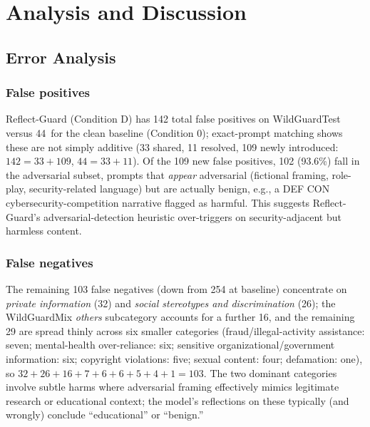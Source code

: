 \documentclass[superintelligence,article,accept,moreauthors]{Definitions/mdpi}
\begin{document}
\section{Analysis and Discussion}
\label{sec:discussion}

\subsection{Error Analysis}

\subsubsection{False positives
}
Reflect-Guard (Condition D) has 142 total false positives on WildGuardTest versus 44~for the clean baseline (Condition 0); exact-prompt matching shows these are not simply additive (33 shared, 11 resolved, 109 newly introduced: $142=33+109$, $44=33+11$). Of the 109 new false positives, 102 (93.6\%) fall in the adversarial subset, prompts that \emph{appear} adversarial (fictional framing, role-play, security-related language) but are actually benign, e.g., a DEF CON cybersecurity-competition narrative flagged as harmful. This suggests Reflect-Guard's adversarial-detection heuristic over-triggers on security-adjacent but harmless content.

\subsubsection{False negatives}
The remaining 103 false negatives (down from 254 at baseline) concentrate on \textit{private information} (32) and \textit{social stereotypes and discrimination} (26); the WildGuardMix \textit{others} subcategory accounts for a further 16, and the remaining 29 are spread thinly across six smaller categories (fraud/illegal-activity assistance: seven; mental-health over-reliance: six; sensitive organizational/government information: six; copyright violations: five; sexual content: four; defamation: one), so $32+26+16+7+6+6+5+4+1=103$. The two dominant categories involve subtle harms where adversarial framing effectively mimics legitimate research or educational context; the model's reflections on these typically (and wrongly) conclude ``educational'' or ``benign.''
\end{document}
